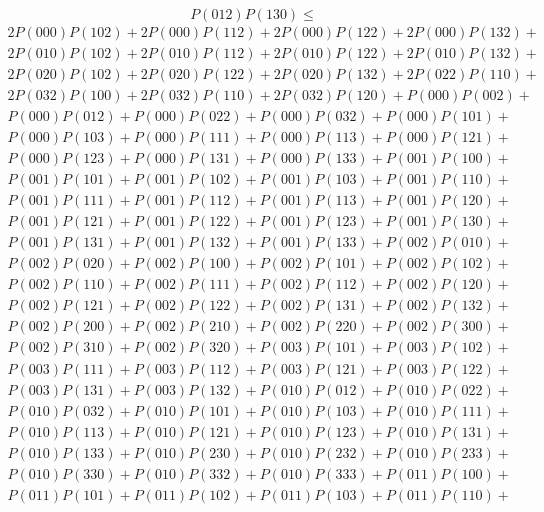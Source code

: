 \documentclass{article}
\theoremstyle{definition}
\begin{document}
    \[ P(012)P(130) \leq \]
    \begin{gather*}
    2P(000)P(102) + 2P(000)P(112) + 2P(000)P(122) + 2P(000)P(132) + \\
    2P(010)P(102) + 2P(010)P(112) + 2P(010)P(122) + 2P(010)P(132) + \\
    2P(020)P(102) + 2P(020)P(122) + 2P(020)P(132) + 2P(022)P(110) + \\
    2P(032)P(100) + 2P(032)P(110) + 2P(032)P(120) + P(000)P(002) + \\
    P(000)P(012) + P(000)P(022) + P(000)P(032) + P(000)P(101) + \\
    P(000)P(103) + P(000)P(111) + P(000)P(113) + P(000)P(121) + \\
    P(000)P(123) + P(000)P(131) + P(000)P(133) + P(001)P(100) + \\
    P(001)P(101) + P(001)P(102) + P(001)P(103) + P(001)P(110) + \\
    P(001)P(111) + P(001)P(112) + P(001)P(113) + P(001)P(120) + \\
    P(001)P(121) + P(001)P(122) + P(001)P(123) + P(001)P(130) + \\
    P(001)P(131) + P(001)P(132) + P(001)P(133) + P(002)P(010) + \\
    P(002)P(020) + P(002)P(100) + P(002)P(101) + P(002)P(102) + \\
    P(002)P(110) + P(002)P(111) + P(002)P(112) + P(002)P(120) + \\
    P(002)P(121) + P(002)P(122) + P(002)P(131) + P(002)P(132) + \\
    P(002)P(200) + P(002)P(210) + P(002)P(220) + P(002)P(300) + \\
    P(002)P(310) + P(002)P(320) + P(003)P(101) + P(003)P(102) + \\
    P(003)P(111) + P(003)P(112) + P(003)P(121) + P(003)P(122) + \\
    P(003)P(131) + P(003)P(132) + P(010)P(012) + P(010)P(022) + \\
    P(010)P(032) + P(010)P(101) + P(010)P(103) + P(010)P(111) + \\
    P(010)P(113) + P(010)P(121) + P(010)P(123) + P(010)P(131) + \\
    P(010)P(133) + P(010)P(230) + P(010)P(232) + P(010)P(233) + \\
    P(010)P(330) + P(010)P(332) + P(010)P(333) + P(011)P(100) + \\
    P(011)P(101) + P(011)P(102) + P(011)P(103) + P(011)P(110) + \\

\end{gather*}
\end{document}
